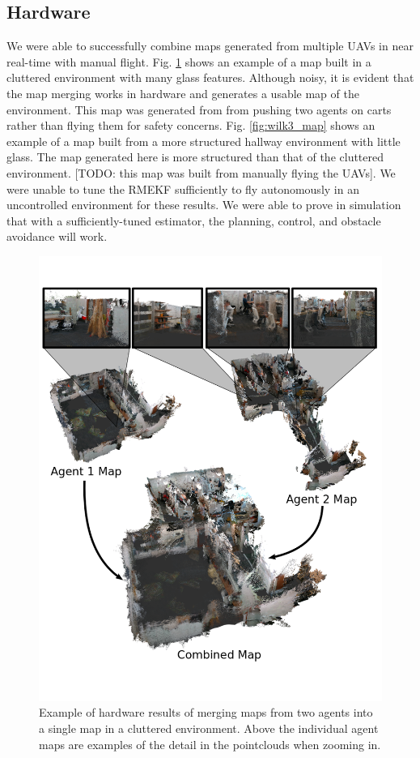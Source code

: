 \documentclass[letterpaper, 10 pt, conference]{ieeeconf}  %
\newcommand{\todo}[1]{{\color{blue}[TODO: #1]}}
\begin{document}
\subsection{Hardware}

We were able to successfully combine maps generated from multiple UAVs in near real-time with manual flight. Fig. \ref{fig:lab_map} shows an example of a map built in a cluttered environment with many glass features. Although noisy, it is evident that the map merging works in hardware and generates a usable map of the environment. This map was generated from from pushing two agents on carts rather than flying them for safety concerns. Fig. \ref{fig:wilk3_map} shows an example of a map built from a more structured hallway environment with little glass. The map generated here is more structured than that of the cluttered environment. \todo{this map was built from manually flying the UAVs}. We were unable to tune the RMEKF sufficiently to fly autonomously in an uncontrolled environment for these results. We were able to prove in simulation that with a sufficiently-tuned estimator, the planning, control, and obstacle avoidance will work.

\begin{figure}
\centering
\includegraphics[width=0.9\linewidth]{lab_map.png}
\caption{Example of hardware results of merging maps from two agents into a single map in a cluttered environment. Above the individual agent maps are examples of the detail in the pointclouds when zooming in.}
\label{fig:lab_map}
\end{figure}
\end{document}
